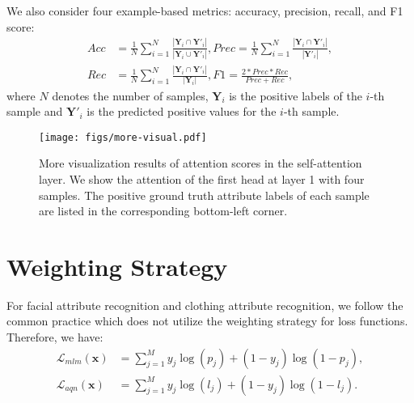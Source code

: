 \documentclass[runningheads]{llncs}
\begin{document}
We also consider four example-based metrics: accuracy, precision, recall, and F1 score:
\begin{equation}
\label{equ:metric:instance}
  \begin{split}
  Acc&= \frac{1}{N} \sum_{i=1}^{N} \frac{|\bm{Y}_i \cap \bm{Y}'_i|}{|\bm{Y}_i  \cup \bm{Y}'_i|},  Prec = \frac{1}{N} \sum_{i=1}^{N} \frac{|\bm{Y}_i \cap \bm{Y}'_i|}{ | \bm{Y}'_i|},   \\
  Rec&= \frac{1}{N} \sum_{i=1}^{N} \frac{|\bm{Y}_i \cap \bm{Y}'_i|}{|\bm{Y}_i  |}, F1 = \frac{2 * Prec * Rec}{Prec + Rec},
  \end{split}
\end{equation}
where $N$ denotes the number of samples, $\bm{Y}_i$ is the  positive labels of the $i$-th sample and $\bm{Y}'_i$ is the predicted positive values for the $i$-th sample.



\begin{figure}[t]
\begin{center}
   \texttt{[image: figs/more-visual.pdf]}
\end{center}
\caption{More visualization results of attention scores in the self-attention layer. We show the attention of the first head at layer 1 with four samples. The positive ground truth attribute labels of each sample are listed in the corresponding bottom-left corner.
}
\label{fig:morevisual}
\end{figure}





\section{Weighting Strategy}
For facial attribute recognition and clothing attribute recognition, we follow the common practice which does not utilize the weighting strategy for loss functions. Therefore, we have:
\begin{equation}
\label{equ:loss:noweight}
  \begin{split}
  \mathcal{L}_{mlm}(\bm{x})&=\sum_{j=1}^{M} \!y_{j} \!\log(p_{j}) \!+\! (1 \!-\! y_{j}) \!\log(1\!-\!p_{j} ),  \\
   \mathcal{L}_{aqn}(\bm{x}) &=\sum_{j=1}^{M} \!y_{j} \!\log(l_{j}) \!+\! (1 \!-\! y_{j}) \!\log(1\!-\!l_{j} ).
  \end{split}
\end{equation}
\end{document}
